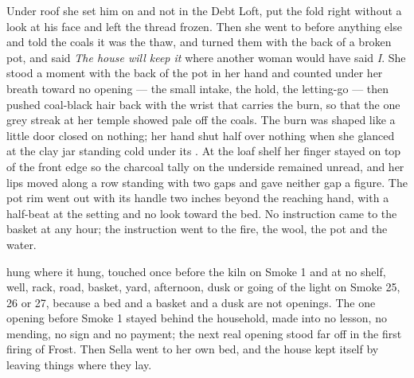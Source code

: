 Under  roof she set him on  and not in the Debt Loft, put the fold right without a look at his face and left the thread frozen. Then she went to  before anything else and told the coals it was the thaw, and turned them with the back of a broken pot, and said \emph{The house will keep it} where another woman would have said \emph{I}. She stood a moment with the back of the pot in her hand and counted under her breath toward no opening --- the small intake, the hold, the letting-go --- then pushed coal-black hair back with the wrist that carries the burn, so that the one grey streak at her temple showed pale off the coals. The burn was shaped like a little door closed on nothing; her hand shut half over nothing when she glanced at the clay jar standing cold under its . At the loaf shelf her finger stayed on top of the front edge so the charcoal tally on the underside remained unread, and her lips moved along a row standing with two gaps and gave neither gap a figure. The pot rim went out with its handle two inches beyond the reaching hand, with a half-beat at the setting and no look toward the bed. No instruction came to the basket at any hour; the instruction went to the fire, the wool, the pot and the water.

 hung where it hung, touched once before the kiln on Smoke 1 and at no shelf, well, rack, road, basket, yard, afternoon, dusk or going of the light on Smoke 25, 26 or 27, because a bed and a basket and a dusk are not openings. The one opening before Smoke 1 stayed behind the household, made into no lesson, no mending, no sign and no payment; the next real opening stood far off in the first firing of Frost. Then Sella went to her own bed, and the house kept itself by leaving things where they lay.

\scenebreak


